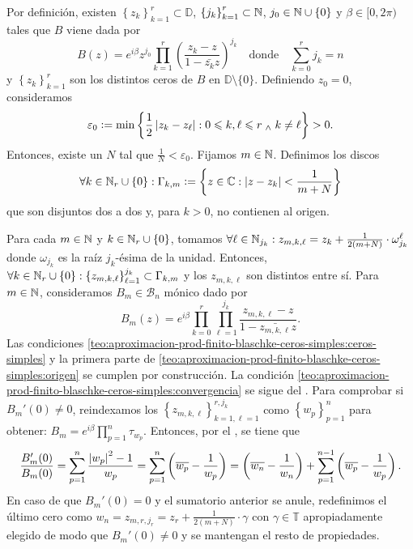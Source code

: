 \begin{dem}
    Por definición, existen $\left\{z_k\right\}_{k=1}^r \subset \mathbb{D}$, $\left\{j_k\right\}_{k=1}^r \subset \mathbb{N}$, $j_0 \in \mathbb{N} \cup \{0\}$ y $\beta \in [0, 2\pi)$ tales que $B$ viene dada por
    \[
    B(z) = e^{i\beta} z^{j_0} \prod_{k=1}^r \left(\frac{z_k - z}{1 - \bar{z_k}z}\right)^{j_k} \quad \text{donde} \quad \sum_{k=0}^r j_k = n
    \]
    y $\left\{z_k\right\}_{k=1}^r$ son los distintos ceros de $B$ en $\mathbb{D} \setminus \{0\}$. Definiendo $z_0 = 0$, consideramos
    \[
    \varepsilon_0 \vcentcolon= \min \left\{ \frac{1}{2} \left|z_k - z_\ell\right| : 0 \leqslant k, \ell \leqslant r \; _{\wedge} \; k \neq \ell \right\} > 0.
    \]
    Entonces, existe un $N$ tal que $\frac{1}{N} < \varepsilon_0$. Fijamos $m \in \mathbb{N}$. Definimos los discos
    \[
    \forall k \in \mathbb{N}_r \cup \{0\} : \Gamma_{k, m} \vcentcolon= \left\{z \in \mathbb{C} : \left|z - z_k\right| < \frac{1}{m+N} \right\}
    \]
    que son disjuntos dos a dos y, para $k > 0$, no contienen al origen.
    
    Para cada $m \in \mathbb{N}$ y $k \in \mathbb{N}_r \cup \{0\}$, tomamos $\forall \ell \in \mathbb{N}_{j_k} : z_{m, k, \ell} = z_k + \frac{1}{2(m+N)} \cdot \omega_{j_k}^\ell$ donde $\omega_{j_k}$ es la raíz $j_k$-ésima de la unidad. Entonces, $\forall k \in \mathbb{N}_r \cup \{0\} : \left\{z_{m, k, \ell} \right\}_{\ell=1}^{j_k} \subset \Gamma_{k, m}$ y los $z_{m, k, \ell}$ son distintos entre sí. Para $m \in \mathbb{N}$, consideramos $B_m \in \mathscr{B}_n$ mónico dado por
    \[
    B_m(z) = e^{i\beta} \prod_{k=0}^r \prod_{\ell=1}^{j_k} \frac{z_{m, k, \ell} - z}{1 - \bar{z_{m, k, \ell}} z}.
    \]
    Las condiciones \ref{teo:aproximacion-prod-finito-blaschke-ceros-simples:ceros-simples} y la primera parte de \ref{teo:aproximacion-prod-finito-blaschke-ceros-simples:origen} se cumplen por construcción. La condición \ref{teo:aproximacion-prod-finito-blaschke-ceros-simples:convergencia} se sigue del .
    Para comprobar si $B_m'(0) \neq 0$, reindexamos los $\left\{z_{m, k, \ell}\right\}_{k=1, \ell=1}^{r, j_k}$ como $\left\{w_p\right\}_{p=1}^{n}$ para obtener: $B_m = e^{i\beta} \prod_{p=1}^{n} \tau_{w_p}$. Entonces, por el , se tiene que 
    \[
    \frac{B_m'(0)}{B_m(0)} = \sum_{p=1}^n \frac{\left|w_p\right|^2 - 1}{w_p} = \sum_{p=1}^n \left(\overline{w_p} - \frac{1}{w_p}\right) = \left(\overline{w_n} - \frac{1}{w_n}\right) + \sum_{p=1}^{n-1} \left(\overline{w_p} - \frac{1}{w_p}\right).
    \]
    En caso de que $B_m'(0) = 0$ y el sumatorio anterior se anule, redefinimos el último cero como $w_{n} = z_{m, r, j_r} = z_r + \frac{1}{2(m+N)} \cdot \gamma$ con $\gamma \in \mathbb{T}$ apropiadamente elegido de modo que $B_m'(0) \neq 0$ y se mantengan el resto de propiedades. \hfill\qedsymbol


\end{dem}

